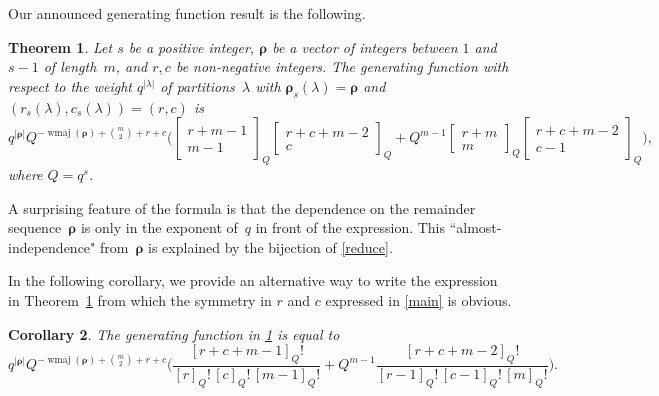 \documentclass[12pt,reqno]{amsart}
\numberwithin{equation}{section}
\newtheorem{theorem}{Theorem}
\newtheorem{corollary}[theorem]{Corollary}
\theoremstyle{definition}
\DeclareMathOperator{\wmaj}{wmaj}
\newcommand{\rem}{{\boldsymbol\rho}}
\begin{document}
Our announced generating function result is the following.

\begin{theorem}
\label{coefficient}
Let $s$ be a positive integer, $\rem$ be a vector of integers between $1$ and~$s-1$ of length~$m$, and $r,c$ be non-negative integers. The generating function with respect to the
weight $q^{|\lambda|}$ of partitions~$\lambda$ with $\rem_s(\lambda)=\rem$ and
$(r_s(\lambda),c_s(\lambda))=(r,c)$ is
$$
q^{|\rem|}  Q^{-\wmaj(\rem)+\binom{m}{2}+r+c} \bigg(\begin{bmatrix} r+m-1 \\ m-1 \end{bmatrix}_Q\begin{bmatrix} r+c+m-2 \\ c\end{bmatrix}_Q
    +Q^{m-1}\begin{bmatrix} r+m \\ m \end{bmatrix}_Q
\begin{bmatrix} r+c+m-2 \\ c-1 \end{bmatrix}_Q \bigg),
$$
where $Q=q^s$.
\end{theorem}

A surprising feature of the formula is that the dependence on the
remainder sequence~$\rem$ is only in the exponent of~$q$ in front of the
expression. This ``almost-independence" from~$\rem$ is explained by
the bijection of \cref{reduce}.

In the following corollary, we provide an alternative way to write the expression in Theorem~\ref{coefficient} from which the symmetry in $r$ and $c$ expressed in \cref{main}
is obvious.

\begin{corollary}\label{rem:1a}
The generating function in \cref{coefficient} is equal to
$$
q^{|\rem|} Q^{-\wmaj(\rem)+\binom{m}{2}+r+c}
\bigg(\frac {[r+c+m-1]_Q!} {[r]_Q!\,[c]_Q!\,[m-1]_Q!}
+Q^{m-1}\frac {[r+c+m-2]_Q!} {[r-1]_Q!\,[c-1]_Q!\,[m]_Q!}
\bigg).
$$
\end{corollary}
\end{document}
